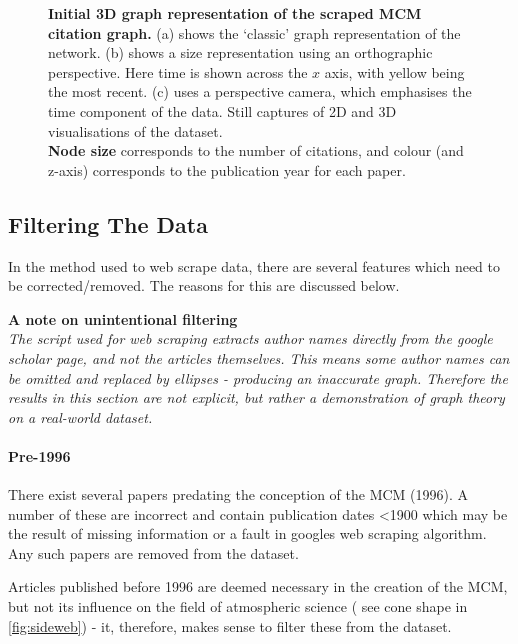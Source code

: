\begin{figure}[]
        \caption{ \textbf{Initial 3D graph representation of the scraped MCM citation graph.} (a) shows the `classic' graph representation of the network. (b) shows a size representation using an orthographic perspective. Here time is shown across the $x$ axis, with yellow being the most recent. (c)
        uses a perspective camera, which emphasises the time component of the data.
        Still captures of 2D and 3D visualisations of the dataset.\\
         \textbf{Node size} corresponds to the number of citations, and colour (and z-axis) corresponds to the publication year for each paper.}
        \label{fig:weball}

\end{figure}


\subsection{Filtering The Data}\label{sec:filter3d}


In the method used to web scrape data, there are several features which need to be corrected/removed. The reasons for this are discussed below.


\textbf{A note on unintentional filtering}\\
\textit{
The script used for web scraping extracts author names directly from the google scholar page, and not the articles themselves. This means some author names can be omitted and replaced by ellipses - producing an inaccurate graph. Therefore the results in this section are not explicit, but rather a demonstration of graph theory on a real-world dataset.
}


\paragraph*{Pre-1996}
There exist several papers predating the conception of the MCM (1996). A number of these are incorrect and contain publication dates <1900 which may be the result of missing information or a fault in googles web scraping algorithm. Any such papers are removed from the dataset.

Articles published before 1996 are deemed necessary in the creation of the MCM, but not its influence on the field of atmospheric science ( see cone shape in \autoref{fig:sideweb}) - it, therefore, makes sense to filter these from the dataset.


